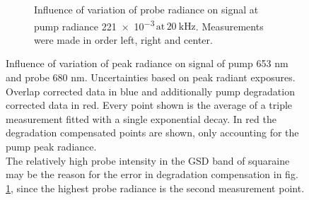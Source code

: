 \documentclass[twoside,openright]{scrreprt}
\def\frep#1{\ensuremath{\,\mathrm{at}\, \SI{#1}{\kilo\hertz}}}
\begin{document}
\begin{figure}[hbtp]
\begin{subfigure}[t]{0.5\linewidth}
\caption{Influence of variation of probe radiance on signal at pump radiance \SI{221e-3}{\radExp}\frep{20}. Measurements were made in order left, right and center.\label{fig:PowerVarProbe}}
\end{subfigure}
\caption{Influence of variation of peak radiance on signal of pump 653 nm and probe 680 nm. Uncertainties based on peak radiant exposures.
Overlap corrected data in blue and additionally pump degradation corrected data in red. Every point shown is the average of a triple measurement fitted with a single exponential decay. In red the degradation compensated points are shown, only accounting for the pump peak radiance.\\ The relatively high probe intensity in the GSD band of squaraine  may be the reason for the error in degradation compensation in fig. \ref{fig:PowerVarProbe}, since the highest probe radiance is the second measurement point. \label{fig:PowerVarRaw}}
\end{figure}
\end{document}
